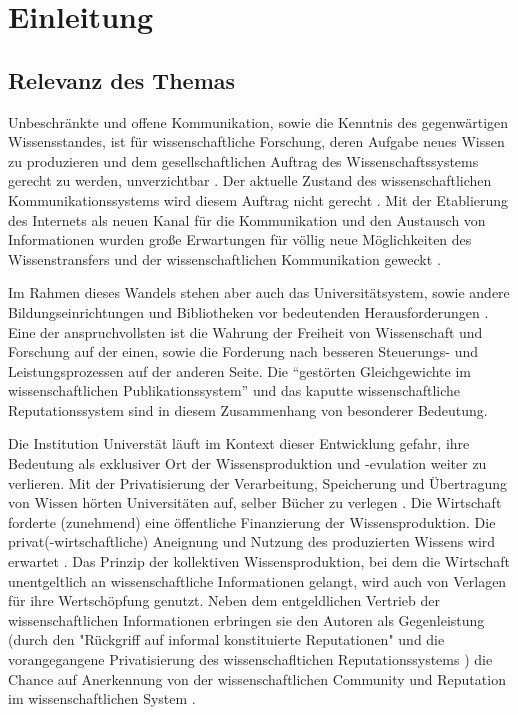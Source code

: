 \chapter{Einleitung} 

\section{Relevanz des Themas} 

Unbeschränkte und offene Kommunikation, sowie die Kenntnis des gegenwärtigen Wissensstandes, ist für wissenschaftliche Forschung, deren Aufgabe neues Wissen zu produzieren und dem gesellschaftlichen Auftrag des Wissenschaftssystems gerecht zu werden, unverzichtbar \cite{Hanekop_2014} \cite{glaeser2006} \cite{gibbons_1994} \cite{Luhmann1998}. Der aktuelle Zustand des wissenschaftlichen Kommunikationssystems wird diesem Auftrag nicht gerecht \cite{Schekman_2013}. Mit der Etablierung des Internets als neuen Kanal für die Kommunikation und den Austausch von Informationen wurden große Erwartungen für völlig neue Möglichkeiten des Wissenstransfers und der wissenschaftlichen Kommunikation geweckt \cite{Hanekop_2014} \cite{schulze_2013_open} \cite{albert_2006_open_implications} \cite{Goodrum_2001} \cite{Lawrence_1999}.

Im Rahmen dieses Wandels stehen aber auch das Universitätsystem, sowie andere Bildungseinrichtungen und Bibliotheken vor bedeutenden Herausforderungen \cite{Harter2006} \cite{Gu_don_2004} \cite{osterloh2008anreize}. Eine der anspruchvollsten ist die Wahrung der Freiheit von Wissenschaft und Forschung auf der einen, sowie die Forderung nach besseren Steuerungs- und Leistungsprozessen \cite{Adler_2009} \cite{gibbons_1994} auf der anderen Seite. Die “gestörten Gleichgewichte im wissenschaftlichen Publikationssystem” \cite{cite:0} und das kaputte wissenschaftliche Reputationssystem \cite{suchen} sind in diesem Zusammenhang von besonderer Bedeutung. 

Die Institution Universtät läuft im Kontext dieser Entwicklung gefahr, ihre Bedeutung als exklusiver Ort der Wissensproduktion \cite{suchen} und -evulation \cite{suchen} weiter zu verlieren. Mit der Privatisierung der Verarbeitung, Speicherung und Übertragung von Wissen hörten Universitäten auf, selber Bücher zu verlegen \cite{cite:0}. Die Wirtschaft forderte (zunehmend) eine öffentliche Finanzierung der Wissensproduktion. Die privat(-wirtschaftliche) Aneignung und Nutzung des produzierten Wissens wird erwartet \cite{cite:2}. Das Prinzip der kollektiven Wissensproduktion, bei dem die Wirtschaft unentgeltlich an wissenschaftliche Informationen gelangt, wird auch von Verlagen für ihre Wertschöpfung genutzt. Neben dem entgeldlichen Vertrieb der wissenschaftlichen Informationen erbringen sie den Autoren als Gegenleistung (durch den "Rückgriff auf informal konstituierte Reputationen" \cite{luhmann_1970_selbststeuerung} und die vorangegangene Privatisierung des wissenschafltichen Reputationssystems \cite{suchen}) die Chance auf Anerkennung von der wissenschaftlichen Community und Reputation im wissenschaftlichen System \cite{cite:21a}. 

